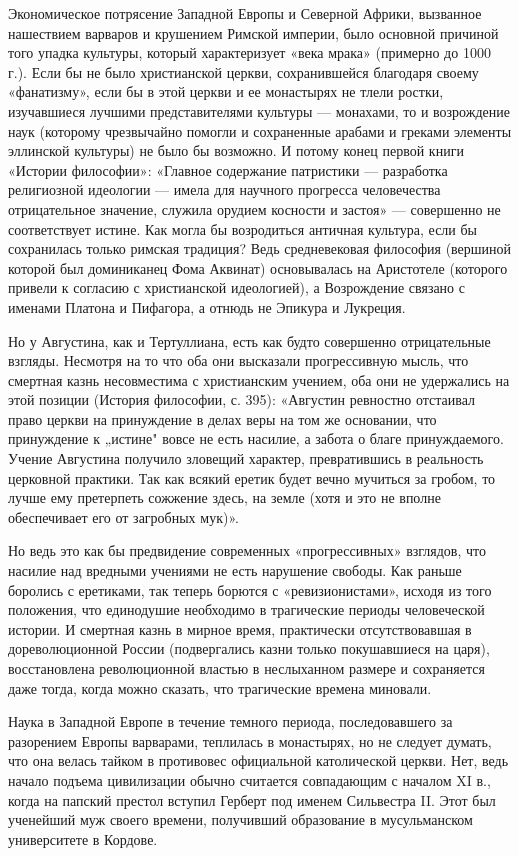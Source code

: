 Экономическое потрясение Западной Европы и Северной Африки, вызванное
нашествием варваров и крушением Римской империи, было основной причиной того
упадка культуры, который характеризует «века мрака» (примерно до 1000 г.). Если
бы не было христианской церкви, сохранившейся благодаря своему «фанатизму»,
если бы в этой церкви и ее монастырях не тлели ростки, изучавшиеся лучшими
представителями культуры --- монахами, то и возрождение наук (которому
чрезвычайно помогли и сохраненные арабами и греками элементы эллинской
культуры) не было бы возможно. И потому конец первой книги «Истории философии»:
«Главное содержание патристики --- разработка религиозной идеологии --- имела для
научного прогресса человечества отрицательное значение, служила орудием
косности и застоя» --- совершенно не соответствует истине. Как могла бы
возродиться античная культура, если бы сохранилась только римская традиция?
Ведь средневековая философия (вершиной которой был доминиканец Фома Аквинат)
основывалась на Аристотеле (которого привели к согласию с христианской
идеологией), а Возрождение связано с именами Платона и Пифагора, а отнюдь не
Эпикура и Лукреция.

Но у Августина, как и Тертуллиана, есть как будто совершенно отрицательные
взгляды. Несмотря на то что оба они высказали прогрессивную мысль, что смертная
казнь несовместима с христианским учением, оба они не удержались на этой
позиции (История философии, с. 395): «Августин ревностно отстаивал право церкви
на принуждение в делах веры на том же основании, что принуждение к „истине"
вовсе не есть насилие, а забота о благе принуждаемого. Учение Августина
получило зловещий характер, превратившись в реальность церковной практики. Так
как всякий еретик будет вечно мучиться за гробом, то лучше ему претерпеть
сожжение здесь, на земле (хотя и это не вполне обеспечивает его от загробных
мук)».

Но ведь это как бы предвидение современных «прогрессивных» взглядов, что
насилие над вредными учениями не есть нарушение свободы. Как раньше боролись с
еретиками, так теперь борются с «ревизионистами», исходя из того положения, что
единодушие необходимо в трагические периоды человеческой истории. И смертная
казнь в мирное время, практически отсутствовавшая в дореволюционной России
(подвергались казни только покушавшиеся на царя), восстановлена революционной
властью в неслыханном размере и сохраняется даже тогда, когда можно сказать,
что трагические времена миновали.

Наука в Западной Европе в течение темного периода, последовавшего за разорением
Европы варварами, теплилась в монастырях, но не следует думать, что она велась
тайком в противовес официальной католической церкви. Нет, ведь начало подъема
цивилизации обычно считается совпадающим с началом XI в., когда на папский
престол вступил Герберт под именем Сильвестра II. Этот был ученейший муж своего
времени, получивший образование в мусульманском университете в Кордове.

